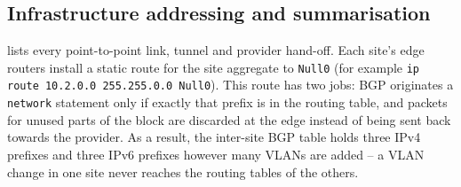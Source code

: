 



\subsection{Infrastructure addressing and summarisation}\label{sec:ip-infra}
 lists every point-to-point link, tunnel and provider hand-off. Each site's edge routers
install a static route for the site aggregate to \texttt{Null0} (for example
\texttt{ip route 10.2.0.0 255.255.0.0 Null0}). This route has two jobs: BGP originates a \texttt{network}
statement only if exactly that prefix is in the routing table, and packets for unused parts of the block
are discarded at the edge instead of being sent back towards the provider. As a result, the inter-site BGP
table holds three IPv4 prefixes and three IPv6 prefixes however many VLANs are added -- a VLAN change in one
site never reaches the routing tables of the others.

\begin{landscape}

\end{landscape}
